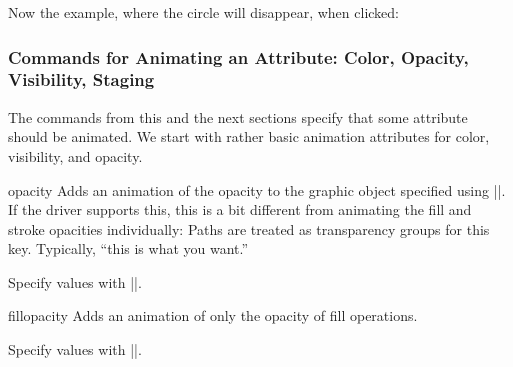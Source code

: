 \begin{command}{\pgfsys@animate{}}
  Now the example, where the circle will disappear, when clicked:
\begin{codeexample}[width=2cm]
\end{codeexample}
\end{command}



\subsubsection{Commands for Animating an Attribute: Color, Opacity,
  Visibility, Staging}

The commands from this and the next sections specify that some
attribute should be animated. We start with rather basic animation
attributes for color, visibility, and opacity.



\begin{sysanimateattribute}{opacity}
  Adds an animation of the opacity to the graphic object specified
  using |\pgfsys@animation@whom|. If the driver supports this, this is
  a bit different from animating the fill and stroke opacities
  individually: Paths are treated as transparency groups for this
  key. Typically, ``this is what you want.''
  
  Specify values with |\pgfsys@animation@val@scalar|.

\begin{codeexample}[width=2cm]
\end{codeexample}
\end{sysanimateattribute}

\begin{sysanimateattribute}{fillopacity}
  Adds an animation of only the opacity of fill operations.
  
  Specify values with |\pgfsys@animation@val@scalar|.

\begin{codeexample}[width=2cm]
\end{codeexample}
\end{sysanimateattribute}


